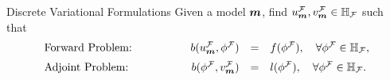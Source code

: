 \documentclass[10pt,aspectratio=149]{beamer}
\begin{document}
\begin{frame}
\begin{block}{Discrete Variational Formulations}
	Given a model $\boldsymbol{m}$, find $u_{\boldsymbol{m}}^{\mathcal{F}}, v_{\boldsymbol{m}}^{\mathcal{F}} \in \mathbb{H}_{\mathcal{F}}$ such that
	\vspace{-1mm}
	\begin{equation*}
	\begin{array}{lrcl}
	\text{Forward Problem:} \hspace{15mm} & b(\um^{\calF},\phi^{\calF}) & = & f(\phi^{\calF}), \quad \forall \phi^{\calF} \in \H_{\calF},   \\[2mm]
	\text{Adjoint Problem:} \hspace{15mm} & b(\phi^{\calF},\vm^{\calF}) & = & l(\phi^{\calF}), \quad \forall \phi^{\calF} \in \H_{\calF}. \\
	\end{array}
	\end{equation*}
\end{block}



\end{frame}
\end{document}
